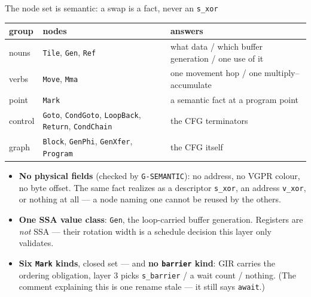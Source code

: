 \documentclass[aspectratio=169,9pt]{beamer}
\newcommand{\tsub}[1]{{\footnotesize\color{gray}#1}}
\newcommand{\key}[1]{\textcolor{acc}{\textbf{#1}}}
\newcommand{\bad}[1]{\textcolor{warn}{\textbf{#1}}}
\begin{document}
\begin{frame}{The node set is semantic: a swap is a fact, never an \texttt{s\_xor}}
\centering\scriptsize
\begin{tabular}{@{}llp{5.2cm}@{}}
\toprule
group & nodes & answers \\
\midrule
nouns   & \texttt{Tile}, \texttt{Gen}, \texttt{Ref} & what data / which buffer generation / one use of it \\
verbs   & \texttt{Move}, \texttt{Mma} & one movement hop / one multiply--accumulate \\
point   & \texttt{Mark} & a semantic fact at a program point \\
control & \texttt{Goto}, \texttt{CondGoto}, \texttt{LoopBack}, \texttt{Return}, \texttt{CondChain} & the CFG terminators \\
graph   & \texttt{Block}, \texttt{GenPhi}, \texttt{GenXfer}, \texttt{Program} & the CFG itself \\
\bottomrule
\end{tabular}

\vspace{5pt}
\begin{itemize}\scriptsize
  \item \key{No physical fields} (checked by \texttt{G-SEMANTIC}): no address, no VGPR colour,
        no byte offset. The same fact realizes as a descriptor \texttt{s\_xor}, an address
        \texttt{v\_xor}, or nothing at all --- a node naming one cannot be reused by the others.
  \item \key{One SSA value class}: \texttt{Gen}, the loop-carried buffer generation. Registers are
        \emph{not} SSA --- their rotation width is a schedule decision this layer only validates.
  \item \key{Six \texttt{Mark} kinds}, closed set --- and \bad{no \texttt{barrier} kind}: GIR carries the
        ordering obligation, layer 3 picks \texttt{s\_barrier} / a wait count / nothing.
        \tsub{(The comment explaining this is one rename stale --- it still says \texttt{await}.)}
\end{itemize}
\end{frame}
\end{document}
